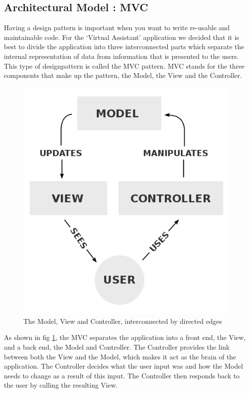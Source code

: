 \subsection{Architectural Model : MVC}
Having a design pattern is important when you want to write re-usable and maintainable code.
For the `Virtual Assistant' application we decided that it is best to divide the application into three interconnected parts which separate the internal representation of data from information that is presented to the users\cite{wiki:mvc}. This type of designpattern is called the MVC pattern. MVC stands for the three components that make up the pattern, the Model, the View and the Controller.
\begin{figure}[h]
\centering
\includegraphics[scale=0.3]{./img/MVC.png}
\caption{\small{The Model, View and Controller, interconnected by directed edges}}
\label{mvc}
	
\end{figure}

As shown in fig \ref{mvc}, the MVC separates the application into a front end, the View, and a back end, the Model and Controller. The Controller provides the link between both the View and the Model, which makes it act as the brain of the application. The Controller decides what the user input was and how the Model needs to change as a result of this input\cite{codinghorror}. The Controller then responds back to the user by calling the resulting View.


